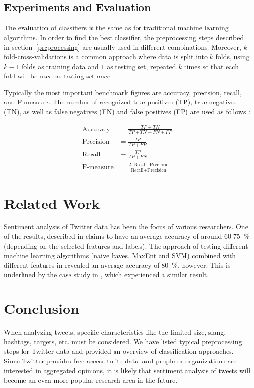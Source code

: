 \documentclass{acm_proc_article-sp}
\begin{document}
\subsection{Experiments and Evaluation}

The evaluation of classifiers is the
same as for traditional machine learning algorithms. In order to find the best
classifier, the preprocessing steps described in section~\ref{preprocessing}
are usually used in different combinations. Moreover, $k$-fold-cross-validations
is a common approach where data is split into $k$ folds, using $k-1$ folds as
training data and $1$ as testing set, repeated $k$ times so that each fold will be
used as testing set once. 

Typically the most important benchmark figures are accuracy, precision, recall,
and F-measure. The number of recognized true positives (TP), true negatives
(TN), as well as false negatives (FN) and  false positives (FP) are used as follows \cite{haddi2013therole, ting2011naive,
sokolova2006beyond, pak2010twitter, ye2009sentiment}:

\begin{align*}
\text{Accuracy} &= \frac{TP+TN}{TP+TN+FN+FP} \\
\text{Precision} &= \frac{TP}{TP+FP} \\
\text{Recall} &= \frac{TP}{TP+FN} \\
\text{F-measure} &= \frac{2 \cdot \text{Recall} \cdot \text{Precision}}{\text{Recall}+\text{Precision}}
\end{align*}


\section{Related Work} \label{related}

Sentiment analysis of Twitter data
has been the focus of various researchers. One of the results, described in
\cite{agarwal2011sentiment} claims to have an average accuracy of around
60-75~\% (depending on the selected features and labels).  The approach of
testing different machine learning algorithms (naive bayes, MaxEnt and SVM)
combined with different features in \cite{go2009twitter} revealed an average
accuracy of 80~\%, however. This is underlined by the case study in
\cite{lin2012large}, which experienced a similar result.

\section{Conclusion} \label{conclusion}

When analyzing tweets, specific
characteristics like the limited size, slang, hashtags, targets, etc. must be
considered. We have listed typical preprocessing steps for Twitter data and
provided an overview of classification approaches.  Since Twitter provides free
access to its data, and people or organizations are interested in aggregated
opinions, it is likely that sentiment analysis of tweets will become an even
more popular research area in the future.



\end{document}
